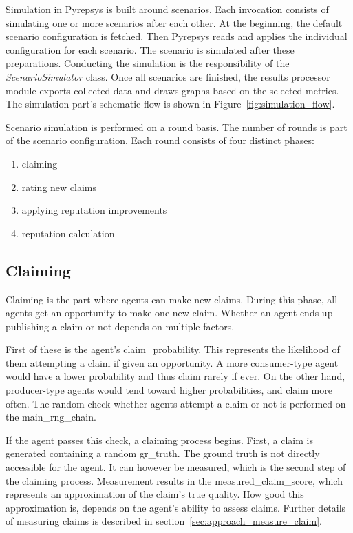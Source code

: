 \documentclass[%
    ]{\PathToTumTemplate/thesis/tum_thesis}
\begin{document}
Simulation in Pyrepsys is built around \glspl{scenario}.
Each invocation consists of simulating one or more scenarios after each other.
At the beginning, the default scenario configuration is fetched.
Then Pyrepsys reads and applies the individual configuration for each scenario.
The scenario is simulated after these preparations.
Conducting the simulation is the responsibility of the \emph{ScenarioSimulator} class.
Once all scenarios are finished, the results processor module exports collected data and draws graphs based on the selected metrics.
The simulation part's schematic flow is shown in Figure~\ref{fig:simulation_flow}.

Scenario simulation is performed on a round basis.
The number of rounds is part of the scenario configuration.
Each round consists of four distinct phases:

\begin{enumerate}
	\item claiming
	\item rating new claims
	\item applying reputation improvements
	\item reputation calculation
\end{enumerate}

\subsection{Claiming}
Claiming is the part where agents can make new \glspl{claim}.
During this phase, all agents get an opportunity to make one new claim.
Whether an agent ends up publishing a claim or not depends on multiple factors.

First of these is the agent's \gls{claim_probability}.
This represents the likelihood of them attempting a claim if given an opportunity.
A more consumer-type agent would have a lower probability and thus claim rarely if ever.
On the other hand, producer-type agents would tend toward higher probabilities, and claim more often.
The random check whether agents attempt a claim or not is performed on the \gls{main_rng_chain}.

If the agent passes this check, a claiming process begins.
First, a claim is generated containing a random \gls{gr_truth}. 
The ground truth is not directly accessible for the agent.
It can however be measured, which is the second step of the claiming process.
Measurement results in the \gls{measured_claim_score}, which represents an approximation of the claim's true quality.
How good this approximation is, depends on the agent's ability to assess claims.
Further details of measuring claims is described in section~\ref{sec:approach_measure_claim}.
\end{document}

